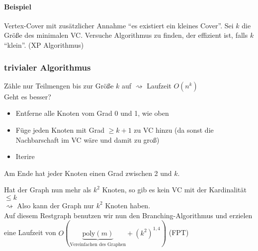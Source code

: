 \paragraph{Beispiel}
Vertex-Cover mit zusätzlicher Annahme "`es existiert ein kleines Cover"'. Sei $k$ die Größe des minimalen VC. Versuche Algorithmus zu finden, der effizient ist, falls $k$ "`klein"'. (XP Algorithmus)
\subsubsection{trivialer Algorithmus}
Zähle nur Teilmengen bis zur Größe $k$ auf $\rightsquigarrow$ Laufzeit $O(n^k)$\\
Geht es besser?\\
\begin{itemize}
	\item Entferne alle Knoten vom Grad 0 und 1, wie oben
	\item Füge jeden Knoten mit Grad $\geq k+1$ zu VC hinzu (da sonst die Nachbarschaft im VC wäre und damit zu groß)
	\item Iterire
\end{itemize}
\begin{figure}[H]
	\centering
\end{figure}
Am Ende hat jeder Knoten einen Grad zwischen 2 und $k$.\\
\begin{figure}[H]
	\centering
	\end{figure}
Hat der Graph nun mehr als $k^2$ Knoten, so gib es kein VC mit der Kardinalität $\leq k$\\
$\rightsquigarrow$ Also kann der Graph nur $k^2$ Knoten haben.\\
Auf diesem Restgraph benutzen wir nun den Branching-Algorithmus und erzielen eine Laufzeit von $O(\underset{\text{Vereinfachen des Graphen}}{\underbrace{\text{poly}(m)}} + \left( k^2 \right)^{1,4} )$ (FPT)
